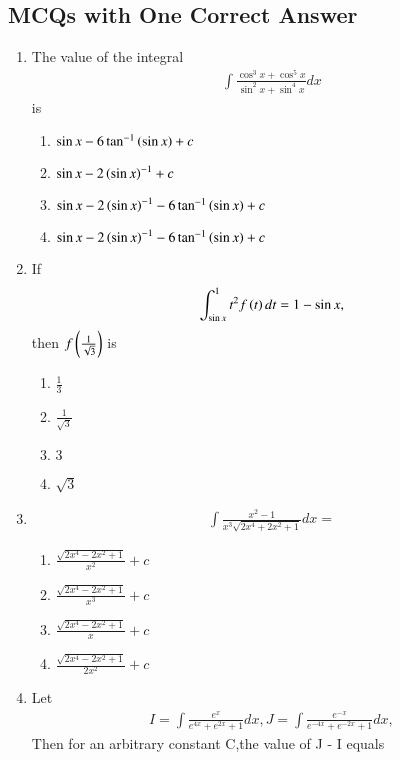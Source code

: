 \documentclass[article,12pt,onecolumn]{IEEEtran}
\theoremstyle{remark}
\begin{document}
\subsection{MCQs with One Correct Answer}
\begin{enumerate}
\item The value of the integral  
\begin{align*}
    \int\frac{\cos^{3}x + \cos^{5}x}{\sin^{2}x + \sin^{4}x}dx
\end{align*} 
is
\hfill {}
\begin{enumerate}
    \item $\sin x - 6\tan^{-1}\left(\sin x\right)+ c$
    \item $\sin x - 2 \left(\sin x\right)^{-1} + c$
    \item $\sin x - 2 \left(\sin x\right)^{-1} - 6 \tan^{-1}\left(\sin x\right) + c$ 
    \item $\sin x - 2 \left(\sin x\right)^{-1} - 6 \tan^{-1}\left(\sin x\right) + c$
\end{enumerate}
\item If 
\begin{align*}
    \int_{\sin x}^{1}t^2 
 f\left(t\right)dt = 1- \sin x,  
\end{align*} 
then $f\left(\frac{1}{\sqrt{3}}\right)$ is 
\hfill {}
\begin{multicols}{2}
\begin{enumerate}
    \item $\frac{1}{3}$
    \item $\frac{1}{\sqrt{3}}$
    \item $3$ 
    \item $\sqrt{3}$
\end{enumerate}
\end{multicols}
\item 
\begin{align*}
    \int\frac{x^{2} - 1}{x^{3}\sqrt{2x^{4}+2x^{2}+1}}dx = 
\end{align*}
\hfill {}
\begin{enumerate}
    \item $\frac{\sqrt{2x^{4}-2x^{2}+1}}{x^{2}} + c$
    \item $\frac{\sqrt{2x^{4}-2x^{2}+1}}{x^{3}} +c$
    \item $\frac{\sqrt{2x^{4}-2x^{2}+1}}{x} +c$ 
    \item $\frac{\sqrt{2x^{4}-2x^{2}+1}}{2x^{2}} +c$
\end{enumerate}
\item Let 
\begin{align*}
    I=\int\frac{e^{x}}{e^{4x}+e^{2x} +1}dx , 
 J=\int\frac{e^{-x}}{e^{-4x}+e^{-2x} +1}dx, 
\end{align*} Then for an arbitrary constant C,the value of J - I equals 


\end{enumerate}
\end{document}
